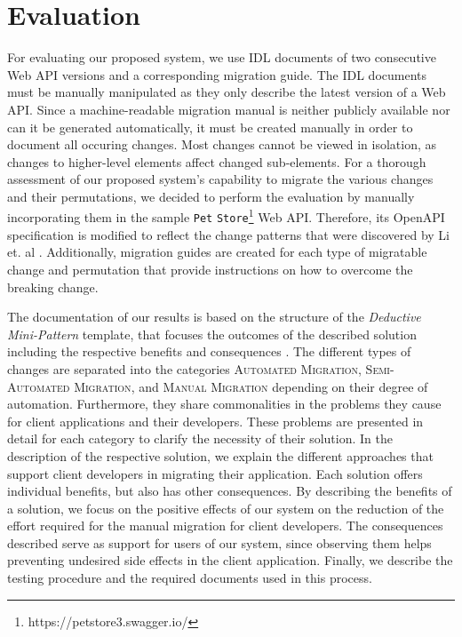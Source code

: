 \section{Evaluation}
\label{sec:Evaluation}
For evaluating our proposed system, we use IDL documents of two consecutive Web API versions and a corresponding migration guide. The IDL documents must be manually manipulated as they only describe the latest version of a Web API. Since a machine-readable migration manual is neither publicly available nor can it be generated automatically, it must be created manually in order to document all occuring changes. Most changes cannot be viewed in isolation, as changes to higher-level elements affect changed sub-elements. For a thorough assessment of our proposed system's capability to migrate the various changes and their permutations, we decided to perform the evaluation by manually incorporating them in the sample \texttt{Pet} \texttt{Store}\footnote{https://petstore3.swagger.io/} Web API. Therefore, its OpenAPI specification is modified to reflect the change patterns that were discovered by Li et. al \cite{li_how_2013}. Additionally, migration guides are created for each type of migratable change and permutation that provide instructions on how to overcome the breaking change. 

The documentation of our results is based on the structure of the 
\textit{Deductive Mini-Pattern} template, that focuses the outcomes of the described solution including the respective benefits and consequences \cite{brown_refactoring_1998}. The different types of changes are separated into the categories \textsc{Automated Migration}, \textsc{Semi-Auto\-mated Migration}, and \textsc{Manual Migration} depending on their degree of automation. Furthermore, they share commonalities in the problems they cause for client applications and their developers. These problems are presented in detail for each category to clarify the necessity of their solution. In the description of the respective solution, we explain the different approaches that support client developers in migrating their application. Each solution offers individual benefits, but also has other consequences. By describing the benefits of a solution, we focus on the positive effects of our system on the reduction of the effort required for the manual migration for client developers. The consequences described serve as support for users of our system, since observing them helps preventing undesired side effects in the client application. Finally, we describe the testing procedure and the required documents used in this process.


\newpage

\newpage
